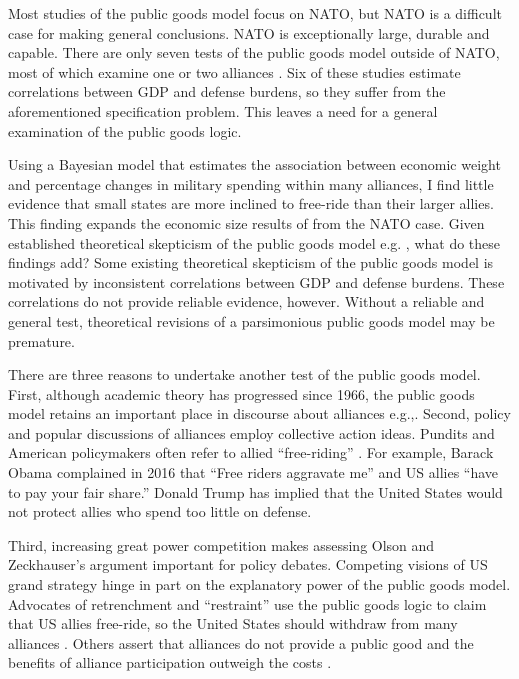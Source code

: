 \documentclass[12pt]{article}
\begin{document}
Most studies of the public goods model focus on NATO, but NATO is a difficult case for making general conclusions. 
NATO is exceptionally large, durable and capable. 
There are only seven tests of the public goods model outside of NATO, most of which examine one or two alliances \citep{Russett1970, Starr1974, Reisinger1983, Thies1987, ConybeareSandler1990, OnealWhatley1996, Siroky2012}. 
Six of these studies estimate correlations between GDP and defense burdens, so they suffer from the aforementioned specification problem.
This leaves a need for a general examination of the public goods logic. 


Using a Bayesian model that estimates the association between economic weight and percentage changes in military spending within many alliances, I find little evidence that small states are more inclined to free-ride than their larger allies.
This finding expands the economic size results of \citet{PluemperNeumayer2015} from the NATO case.
Given established theoretical skepticism of the public goods model e.g. \citep{Palmer1990, GatesTerasawa1992, SandlerHartley2001, Norrlof2010, NiouZeigler2019}, what do these findings add? 
Some existing theoretical skepticism of the public goods model is motivated by inconsistent correlations between GDP and defense burdens. 
These correlations do not provide reliable evidence, however. 
Without a reliable and general test, theoretical revisions of a parsimonious public goods model may be premature.


There are three reasons to undertake another test of the public goods model. 
First, although academic theory has progressed since 1966, the public goods model retains an important place in discourse about alliances e.g.,\citep{Walt1990, Sandler1993, Mearsheimer1994, Goldstein1995, SandlerHartley2001, Garfinkel2004, Walt2009, Norrlof2010, Barrett2010, PluemperNeumayer2015}.
Second, policy and popular discussions of alliances employ collective action ideas.
Pundits and American policymakers often refer to allied ``free-riding'' \citep{Lanoszka2015}.   
For example, Barack Obama complained in 2016 that ``Free riders aggravate me'' and US allies ``have to pay your fair share.'' 
Donald Trump has implied that the United States would not protect allies who spend too little on defense. 

Third, increasing great power competition makes assessing Olson and Zeckhauser's argument important for policy debates. 
Competing visions of US grand strategy hinge in part on the explanatory power of the public goods model. 
Advocates of retrenchment and ``restraint'' use the public goods logic to claim that US allies free-ride, so the United States should withdraw from many alliances \citep{Preble2009, Posen2014}. 
Others assert that alliances do not provide a public good and the benefits of alliance participation outweigh the costs \citep{Brooksetal2013, BrandsFeaver2017}. 
\end{document}
